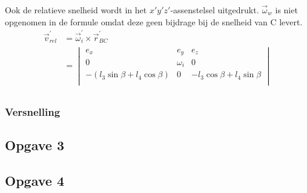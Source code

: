 Ook de relatieve snelheid wordt in het $x'y'z'$-assenstelsel uitgedrukt. $\vec{\omega}_{w}$ is niet opgenomen in de formule omdat deze geen bijdrage bij de snelheid van C levert.
\begin{equation}
\begin{split}
\vec{v}_{rel}^{'}&=\vec{\omega}_{i}^{'}\times\vec{r}_{BC}^{'}\\
&=\begin{vmatrix}
e_{x}&e_{y}&e_{z}\\
0&\omega_{i}&0\\
-(l_{3}\sin{\beta}+l_{4}\cos{\beta})&0&-l_{3}\cos{\beta}+l_{4}\sin{\beta}\\
\end{vmatrix}\\
\end{split}
\label{eq:kin2.7}
\end{equation}
\subsubsection{Versnelling}
\subsection{Opgave 3}
\subsection{Opgave 4}